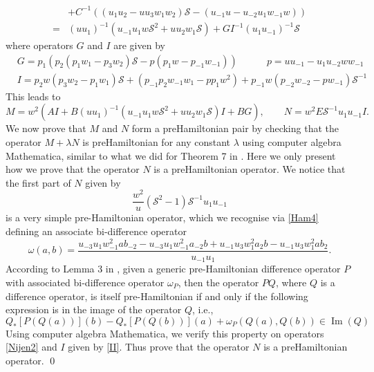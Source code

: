 \documentclass[fleqn,11pt,twoside]{article}
\makeatletter
\DeclareMathOperator{\Ima}{Im}
\renewenvironment{proof}[1][\proofname]{\par
  \normalfont
  \topsep6\p@\@plus6\p@ \trivlist
  \item[\hskip\labelsep\textbf{%
    #1\@addpunct{.}}]\ignorespaces
}{%
  \qed\endtrivlist
}
\theoremstyle{definition}
\makeatother
\begin{document}
\begin{proof}
\begin{equation*}
\begin{split}
& + C^{-1} \left((u_1 u_{2}-u u_3 w_1 w_2) \mathcal{S}-(u_{-1} u-u_{-2} u_{1} w_{-1} w) \right)\\
 = &  \left({u u_1}\right)^{-1}\left(u_{-1} u_1 w \mathcal{S}^2+u u_2 w_1 \mathcal{S}\right) + G I^{-1}(u_1 u_{-1})^{-1} \mathcal{S}
\end{split}
\end{equation*}
where operators $G$ and $I$ are given by
\begin{equation}\label{II}
\begin{split}
&G=  p_1\left(p_2\left(p_1 w_1-p_3 w_2 \right)\mathcal{S}- p \left(p_1 w - p_{-1}w_{-1}\right)\right) \qquad \quad p= u u_{-1}-u_1 u_{-2} w w_{-1} \\
&I=  p_2 w\left(p_3 w_2-p_1 w_1\right)\mathcal{S}+\left(p_{-1}p_2 w_{-1} w_1 - p p_1 w^2\right) +p_{-1} w\left(p_{-2} w_{-2}-p w_{-1}\right)\mathcal{S}^{-1}
\end{split}
\end{equation}
This leads to
$$
M= w^2 \left(A I + B \left({u u_1}\right)^{-1}\left(u_{-1} u_1 w \mathcal{S}^2+u u_2 w_1 \mathcal{S}\right) I + B G\right), \qquad
N= w^2 E \mathcal{S}^{-1} u_1 u_{-1} I.
$$
We now prove that $M$ and $N$ form a preHamiltonian pair by checking that the operator
$M+\lambda N$ is preHamiltonian for any constant $\lambda$ using computer algebra Mathematica,
similar to what we did for Theorem 7 in \cite{4}. Here we only present how we prove that
the operator $N$ is a preHamiltonian operator.
We notice that the first part of $N$ given by
		\begin{equation}
            \frac{w^2}{u}\left(
\mathcal{S}^2-1\right)\mathcal{S}^{-1} u_1 u_{-1}
			\label{Nijen2}
		\end{equation}
is a very simple pre-Hamiltonian operator, which we recognise via \eqref{Ham4} defining an associate bi-difference operator
		\begin{equation*}
			\omega(a,b) = \frac{u_{-3} u_1 w_{-1}^2 a
b_{-2}-u_{-3} u_1 w_{-1}^2 a_{-2} b +u_{-1} u_3 w_1^2 a_2 b -u_{-1} u_3 w_1^2 a
b_2}{u_{-1} u_1} .
			\label{Nijen3}
		\end{equation*}
		According to Lemma 3 in \cite{42}, given a generic
pre-Hamiltonian difference operator $P$ with associated bi-difference operator
$\omega_P$, then the operator $P Q$, where $Q$ is a difference operator,
is itself pre-Hamiltonian if and only if the following expression is in the image of
the operator $Q$, i.e.,
		\begin{equation*}
			Q_*[P(Q(a))](b)-Q_*[P(Q(b))](a)+\omega_P(Q(a),Q(b)) \in
\Ima\left(Q\right)
		\end{equation*}
Using computer algebra Mathematica,  we verify this property on operators
\eqref{Nijen2} and $I$ given by \eqref{II}. Thus prove that the operator $N$ is a preHamiltonian operator.
	\end{proof}
\end{document}
